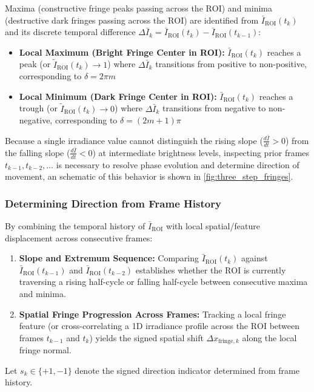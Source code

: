 Maxima (constructive fringe peaks passing across the $\text{ROI}$) and minima (destructive dark fringes passing across the $\text{ROI}$) are identified from $\bar{I}_{\text{ROI}}(t_k)$ and its discrete temporal difference $\Delta \bar{I}_k = \bar{I}_{\text{ROI}}(t_k) - \bar{I}_{\text{ROI}}(t_{k-1})$:
\begin{itemize}
    \item \textbf{Local Maximum (Bright Fringe Center in ROI):} $\bar{I}_{\text{ROI}}(t_k)$ reaches a peak (or $\tilde{I}_{\text{ROI}}(t_k) \to 1$) where $\Delta \bar{I}_k$ transitions from positive to non-positive, corresponding to $\delta = 2\pi m$
    \item \textbf{Local Minimum (Dark Fringe Center in ROI):} $\bar{I}_{\text{ROI}}(t_k)$ reaches a trough (or $\tilde{I}_{\text{ROI}}(t_k) \to 0$) where $\Delta \bar{I}_k$ transitions from negative to non-negative, corresponding to $\delta = (2m + 1) \pi$
\end{itemize}
Because a single irradiance value cannot distinguish the rising slope ($\frac{d\bar{I}}{dt} > 0$) from the falling slope ($\frac{d\bar{I}}{dt} < 0$) at intermediate brightness levels, inspecting prior frames $t_{k-1}, t_{k-2}, \dots$ is necessary to resolve phase evolution and determine direction of movement, an schematic of this behavior is shown in \cref{fig:three_step_fringes}.

\subsubsection{Determining Direction from Frame History}
By combining the temporal history of $\bar{I}_{\text{ROI}}$ with local spatial/feature displacement across consecutive frames:
\begin{enumerate}
    \item \textbf{Slope and Extremum Sequence:} Comparing $\bar{I}_{\text{ROI}}(t_k)$ against $\bar{I}_{\text{ROI}}(t_{k-1})$ and $\bar{I}_{\text{ROI}}(t_{k-2})$ establishes whether the $\text{ROI}$ is currently traversing a rising half-cycle or falling half-cycle between consecutive maxima and minima.
    \item \textbf{Spatial Fringe Progression Across Frames:} Tracking a local fringe feature (or cross-correlating a 1D irradiance profile across the $\text{ROI}$ between frames $t_{k-1}$ and $t_k$) yields the signed spatial shift $\Delta x_{\text{fringe}, k}$ along the local fringe normal.
\end{enumerate}
Let $s_k \in \{+1, -1\}$ denote the signed direction indicator determined from frame history.

